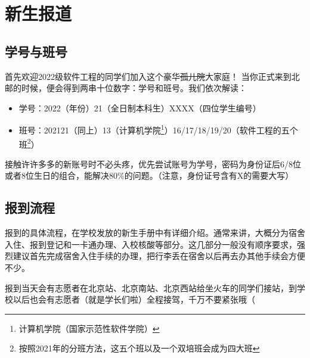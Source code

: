 \section{新生报道}

\subsection*{学号与班号}

首先欢迎2022级软件工程的同学们加入这个豪华\sout{孤儿院}大家庭！
当你正式来到北邮的时候，便会得到两串十位数字：学号和班号。我们依次解读：
\begin{itemize}
    \kaishu
    \item 学号：2022（年份）21（全日制本科生）XXXX（四位学生编号）
    \item 班号：202121（同上）13（计算机学院\footnote{计算机学院（国家示范性软件学院）}）16/17/18/19/20（软件工程的五个班\footnote{按照2021年的分班方法，这五个班以及一个双培班会成为四大班}）
\end{itemize}

接触许许多多的新账号时不必头疼，优先尝试账号为学号，密码为身份证后6/8位或者8位生日的组合，能解决80\%的问题。（注意，身份证号含有X的需要大写）

\subsection*{报到流程}

报到的具体流程，在学校发放的新生手册中有详细介绍。通常来讲，大概分为宿舍入住、报到登记和一卡通办理、入校核酸等部分。这几部分一般没有顺序要求，强烈建议首先完成宿舍入住手续的办理，把行李丢在宿舍以后再去办其他手续会方便不少。

报到当天会有志愿者在北京站、北京南站、北京西站给坐火车的同学们接站，到学校以后也会有志愿者（就是学长们啦）全程接驾，千万不要紧张哦（
